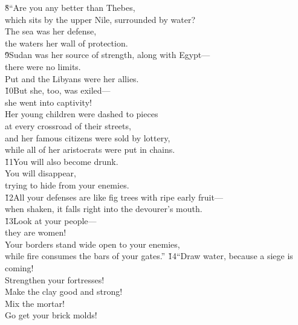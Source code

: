 \begin{poetry}
\poeml \v{8}``Are you any better than Thebes, \\
\poemll    which sits by the upper Nile, surrounded by water? \\
\poeml The sea was her defense, \\
\poemll    the waters her wall of protection. \\
\poeml \v{9}Sudan was her source of strength, along with Egypt--- \\
\poemll    there were no limits. \\
\poeml Put and the Libyans were her allies. \\
\poeml \v{10}But she, too, was exiled--- \\
\poemll    she went into captivity! \\
\poeml Her young children were dashed to pieces \\
\poemll    at every crossroad of their streets, \\
\poeml and her famous citizens were sold by lottery, \\
\poemll    while all of her aristocrats were put in chains. \\
\poeml \v{11}You will also become drunk. \\
\poemll    You will disappear, \\
\poemlll       trying to hide from your enemies. \\
\poeml \v{12}All your defenses are like fig trees with ripe early fruit--- \\
\poemll    when shaken, it falls right into the devourer's mouth. \\
\poeml \v{13}Look at your people--- \\
\poemll    they are women! \\
\poeml Your borders stand wide open to your enemies, \\
\poemll    while fire consumes the bars of your gates.''
\poeml \v{14}``Draw water, because a siege is coming! \\
\poemll    Strengthen your fortresses! \\
\poeml Make the clay good and strong! \\
\poemll    Mix the mortar! \\
\poemlll       Go get your brick molds! \\

\end{poetry}
